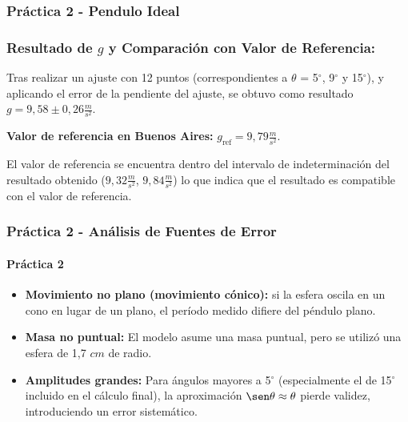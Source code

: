 
\subsubsection{Práctica 2 - Pendulo Ideal}

\subsubsection{Resultado de $g$ y Comparación con Valor de Referencia:}

Tras realizar un ajuste con 12 puntos (correspondientes a $\theta$ = 5$^{\circ}$, 9$^{\circ}$ y 15$^{\circ}$), y aplicando el error de la pendiente del ajuste, se obtuvo como resultado $g = 9{,}58 \pm 0{,}26 \frac{m}{s^2}$.

\textbf{Valor de referencia en Buenos Aires:} $g_{\text{ref}} = 9{,}79 \frac{m}{s^2}$.

El valor de referencia se encuentra dentro del intervalo de indeterminación del resultado obtenido ($9{,}32 \frac{m}{s^2}$, $9{,}84 \frac{m}{s^2}$) lo que indica que el resultado es compatible con el valor de referencia.

\subsubsection{Práctica 2 - Análisis de Fuentes de Error}

\paragraph{Práctica 2}
\begin{itemize}
    \item \textbf{Movimiento no plano (movimiento cónico):} si la esfera oscila en un cono en lugar de un plano, el período medido difiere del péndulo plano.
    \item \textbf{Masa no puntual:} El modelo asume una masa puntual, pero se utilizó una esfera de 1,7 $cm$ de radio.
    \item \textbf{Amplitudes grandes:} Para ángulos mayores a 5$^{\circ}$ (especialmente el de 15$^{\circ}$ incluido en el cálculo final), la aproximación $\sen \theta \approx \theta$ pierde validez, introduciendo un error sistemático.
\end{itemize}

